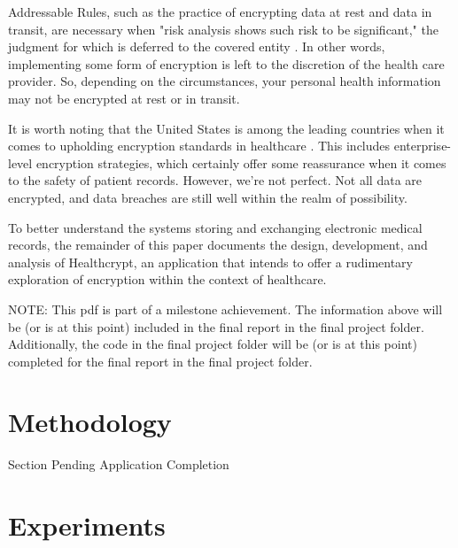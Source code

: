 \documentclass[letterpaper, 10pt,DIV=13]{scrartcl}
\begin{document}
\begin{multicols}{2}
\begin{spacing}{1.25}
Addressable Rules, such as the practice of encrypting data at rest and data in transit, are necessary when "risk analysis shows such risk to be significant," the judgment for which is deferred to the covered entity \cite{hippaprof2017}. In other words, implementing some form of encryption is left to the discretion of the health care provider. So, depending on the circumstances, your personal health information may not be encrypted at rest or in transit.

It is worth noting that the United States is among the leading countries when it comes to upholding encryption standards in healthcare \cite{ponemon2020}. This includes enterprise-level encryption strategies, which certainly offer some reassurance when it comes to the safety of patient records. However, we're not perfect. Not all data are encrypted, and data breaches are still well within the realm of possibility.

To better understand the systems storing and exchanging electronic medical records, the remainder of this paper documents the design, development, and analysis of Healthcrypt, an application that intends to offer a rudimentary exploration of encryption within the context of healthcare.

NOTE: This pdf is part of a milestone achievement. The information above will be (or is at this point) included in the final report in the final project folder. Additionally, the code in the final project folder will be (or is at this point) completed for the final report in the final project folder.

\end{spacing}

\vspace{-2.5pt}

\section*{Methodology}
\begin{spacing}{1.25}

Section Pending Application Completion

\end{spacing}

\vspace{-2.5pt}

\section*{Experiments}
\begin{spacing}{1.25}


\end{spacing}
\end{multicols}
\end{document}
